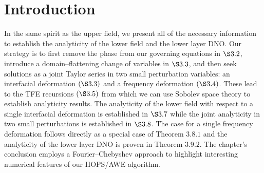 \section{Introduction}
\label{intro:chapter 3 introduction}
In the same spirit as the upper field, we present all of the necessary information to establish the analyticity of the lower field and the lower layer DNO. Our strategy is to first remove the phase from our governing equations in $\S 3.2$, introduce a domain--flattening change of variables in $\S3.3$, and then seek solutions as a joint Taylor series in two small perturbation variables: an interfacial deformation $(\S3.3)$ and a frequency deformation $(\S3.4)$. These lead to the TFE recursions $(\S3.5)$ from which we can use Sobolev space theory to establish analyticity results. The analyticity of the lower field with respect to a single interfacial deformation is established in $\S3.7$ while the joint analyticity in two small perturbations is established in $\S3.8$. The case for a single frequency deformation follows directly as a special case of Theorem $3.8.1$ and the analyticity of the lower layer DNO is proven in Theorem $3.9.2$. The chapter's conclusion employs a Fourier--Chebyshev approach to highlight interesting numerical features of our HOPS/AWE algorithm. 